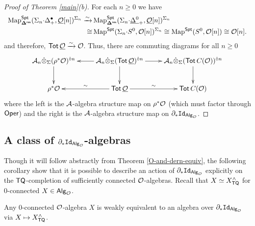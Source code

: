 \begin{proof}[Proof of Theorem \ref{main}(b)]
    For each $n\geq 0$ we have \begin{align*}
        \operatorname{Map}_{\mathbf{\Delta}^{\mathsf{res}}}^{\mathsf{Spt}} (\Sigma_n {\cdot} \Delta^{\bullet}_+, \underline{\mathcal{O}}[n])^{\Sigma_n}\xrightarrow{\sim}& 
        \operatorname{Map}_{\mathbf{\Delta}^{\mathsf{res}}}^{\mathsf{Spt}} (\Sigma_n {\cdot} \underline{\Delta^0}_+, \underline{\mathcal{O}}[n])^{\Sigma_n} \\
        \cong& \operatorname{Map}^{\mathsf{Spt}}( \Sigma_n {\cdot} S^0, \mathcal{O}[n])^{\Sigma_n}\cong \operatorname{Map}^{\mathsf{Spt}}(S^0, \mathcal{O}[n])\cong \mathcal{O}[n].
    \end{align*} and therefore, $\operatorname{\mathsf{Tot}} \underline{\mathcal{O}}\xrightarrow{\sim} \mathcal{O}$. Thus, there are commuting diagrams for all $n\geq 0$ \begin{equation} \xymatrix{
    \Cal{A}_n \tensordot_{\Sigma}  (\rho^*\Cal{O})^{\circhat n} \ar[d]
    & 
    \Cal{A}_n \tensordot_{\Sigma}  (\Tot \underline{\Cal{O}})^{\circhat n} \ar[d] \ar[r] \ar[l]
    &
    \Cal{A}_n \tensordot_{\Sigma}  (\Tot C(\Cal{O}))^{\circhat n} \ar[d]
    \\
    \rho^*\Cal{O}
    &
    \Tot \underline{\Cal{O}} \ar[r]^-{\sim} \ar[l]_-{\sim}
    &
    \Tot C(\Cal{O}) 
    }\end{equation}
    where the left is the $\mathcal{A}$-algebra structure map on $\rho^* \mathcal{O}$ (which must factor through $\mathsf{Oper}$) and the right is the $\mathcal{A}$-algebra structure map on $\partial_* \mathtt{Id}_{{\mathsf{Alg}_{\mathcal{O}}}}$.\end{proof}

\subsection{A class of $\partial_* \mathtt{Id}_{{\mathsf{Alg}_{\mathcal{O}}}}$-algebras} 
Though it will follow abstractly from Theorem \ref{O-and-dern-equiv}, the following corollary show that it is possible to describe an action of $\partial_* \mathtt{Id}_{{\mathsf{Alg}_{\mathcal{O}}}}$ explicitly on the $\mathsf{TQ}$-completion of sufficiently connected $\mathcal{O}$-algebras. Recall that $X\simeq X_{\mathsf{TQ}}^{\wedge}$ for $0$-connected $X \in {\mathsf{Alg}_{\mathcal{O}}}$.

\begin{corollary} \label{TQ-completion-is-der-alg}
    Any $0$-connected $\mathcal{O}$-algebra $X$ is weakly equivalent to an algebra over $\partial_* \mathtt{Id}_{{\mathsf{Alg}_{\mathcal{O}}}}$ via $X\mapsto X_{\mathsf{TQ}}^{\wedge}$. 
\end{corollary}    
    
